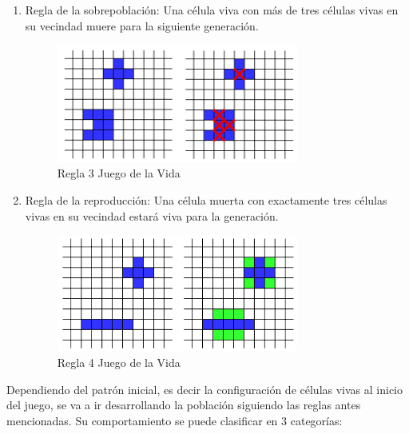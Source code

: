 \documentclass[12pt,letterpaper]{article}
\begin{document}
\begin{enumerate}
\item Regla de la sobrepoblación: Una célula viva con más de tres células vivas en su vecindad muere para la siguiente generación.

\begin{figure}[H]
\centering
\includegraphics[width=0.75\textwidth]{img/Regla3.png}
\caption{\label{fig:Regla1}Regla 3 Juego de la Vida \cite{Suarez}}
\end{figure}

\item Regla de la reproducción: Una célula muerta con exactamente tres células vivas en su vecindad estará viva para la generación.

\begin{figure}[H]
\centering
\includegraphics[width=0.75\textwidth]{img/Regla4.png}
\caption{\label{fig:Regla4}Regla 4 Juego de la Vida \cite{Suarez}}
\end{figure}

\end{enumerate}

Dependiendo del patrón inicial, es decir la configuración de células vivas al inicio del juego, se va a ir desarrollando la población siguiendo las reglas antes mencionadas. Su comportamiento se puede clasificar en 3 categorías:
\end{document}

